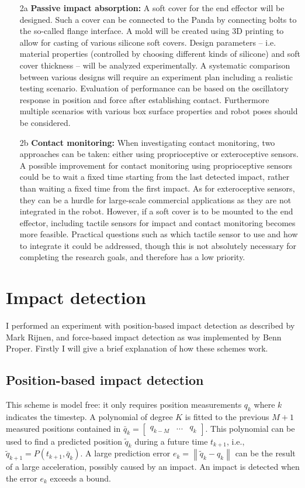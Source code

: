 \documentclass[11pt]{report}
\numberwithin{equation}{section}        %
\numberwithin{figure}{section}          %
\numberwithin{table}{section}           %
\begin{document}
\begin{enumerate}
   \item[2a] \textbf{Passive impact absorption:} A soft cover for the end effector will be designed. Such a cover can be connected to the Panda by connecting bolts to the so-called flange interface. A mold will be created using 3D printing to allow for casting of various silicone soft covers. Design parameters -- i.e. material properties (controlled by choosing different kinds of silicone) and soft cover thickness -- will be analyzed experimentally. A systematic comparison between various designs will require an experiment plan including a realistic testing scenario. Evaluation of performance can be based on the oscillatory response in position and force after establishing contact. Furthermore multiple scenarios with various box surface properties and robot poses should be considered.
  
  \item[2b] \textbf{Contact monitoring:} When investigating contact monitoring, two approaches can be taken: either using proprioceptive or exteroceptive sensors. A possible improvement for contact monitoring using proprioceptive sensors could be to wait a fixed time starting from the last detected impact, rather than waiting a fixed time from the first impact. As for exteroceptive sensors, they can be a hurdle for large-scale commercial applications as they are not integrated in the robot. However, if a soft cover is to be mounted to the end effector, including tactile sensors for impact and contact monitoring becomes more feasible. Practical questions such as which tactile sensor to use and how to integrate it could be addressed, though this is not absolutely necessary for completing the research goals, and therefore has a low priority.
  \end{enumerate}
  \newpage
  \section{Impact detection}
  I performed an experiment with position-based impact detection as described by Mark Rijnen, and force-based impact detection as was implemented by Benn Proper. Firstly I will give a brief explanation of how these schemes work.

  \subsection{Position-based impact detection}
  This scheme is model free: it only requires position measurements $q_k$ where $k$ indicates the timestep. A polynomial of degree $K$ is fitted to the previous $M+1$ measured positions contained in $\bar{q}_k = \begin{bmatrix} q_{k-M}& ... & q_{k} \end{bmatrix}$. This polynomial can be used to find a predicted position $\tilde{q}_k$ during a future time $t_{k+1}$, i.e., $\tilde{q}_{k+1}=P(t_{k+1},\bar{q}_k)$. A large prediction error $e_{k}=\left \|  \tilde{q}_{k}-q_{k}\right \|$ can be the result of a large acceleration, possibly caused by an impact. An impact is detected when the error $e_k$ exceeds a bound.
\end{document}
